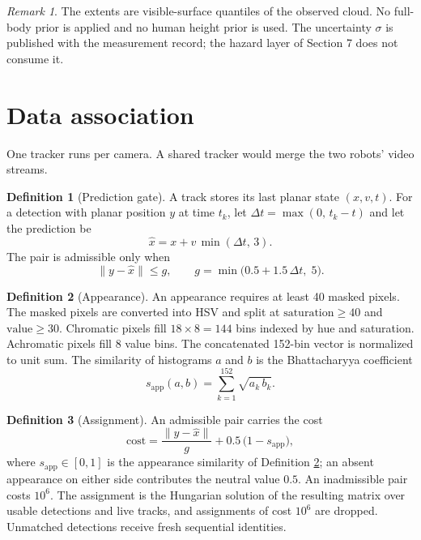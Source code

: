 \documentclass[10pt,a4paper]{article}
\theoremstyle{plain}
\theoremstyle{definition}
\newtheorem{definition}{Definition}[section]
\theoremstyle{remark}
\newtheorem{remark}{Remark}[section]
\begin{document}
\begin{remark}
The extents are visible-surface quantiles of the observed cloud. No full-body prior is applied and no human height prior is used. The uncertainty $\sigma$ is published with the measurement record; the hazard layer of Section 7 does not consume it.
\end{remark}

\section{Data association}

One tracker runs per camera. A shared tracker would merge the two robots' video streams.

\begin{definition}[Prediction gate]\label{def:gate}
A track stores its last planar state $(x, v, t)$. For a detection with planar position $y$ at time $t_k$, let $\Delta t = \max(0,\, t_k - t)$ and let the prediction be
\begin{equation}
\hat{x} = x + v\,\min(\Delta t,\, 3).
\end{equation}
The pair is admissible only when
\begin{equation}
\|y - \hat{x}\| \le g, \qquad g = \min\bigl(0.5 + 1.5\,\Delta t,\; 5\bigr).
\end{equation}
\end{definition}

\begin{definition}[Appearance]\label{def:appearance}
An appearance requires at least 40 masked pixels. The masked pixels are converted into HSV and split at $\mathrm{saturation} \ge 40$ and $\mathrm{value} \ge 30$. Chromatic pixels fill $18 \times 8 = 144$ bins indexed by hue and saturation. Achromatic pixels fill 8 value bins. The concatenated 152-bin vector is normalized to unit sum. The similarity of histograms $a$ and $b$ is the Bhattacharyya coefficient
\begin{equation}
s_{\mathrm{app}}(a, b) = \sum_{k=1}^{152} \sqrt{a_k\, b_k}.
\end{equation}
\end{definition}

\begin{definition}[Assignment]\label{def:hungarian}
An admissible pair carries the cost
\begin{equation}
\mathrm{cost} = \frac{\|y - \hat{x}\|}{g} + 0.5\,\bigl(1 - s_{\mathrm{app}}\bigr),
\end{equation}
where $s_{\mathrm{app}} \in [0,1]$ is the appearance similarity of Definition \ref{def:appearance}; an absent appearance on either side contributes the neutral value $0.5$. An inadmissible pair costs $10^{6}$. The assignment is the Hungarian solution of the resulting matrix over usable detections and live tracks, and assignments of cost $10^{6}$ are dropped. Unmatched detections receive fresh sequential identities.
\end{definition}
\end{document}
